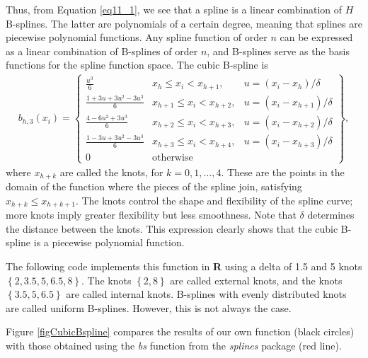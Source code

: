 Thus, from Equation \ref{eq11_1}, we see that a spline is a linear combination of \(H\) B-splines. The latter are polynomials of a certain degree, meaning that splines are piecewise polynomial functions. Any spline function of order \(n\) can be expressed as a linear combination of B-splines of order \(n\), and B-splines serve as the basis functions for the spline function space.
The cubic B-spline is 
\begin{align*}
	b_{h,3}(x_i)=\begin{Bmatrix}
		\frac{u^3}{6} & x_h \leq x_i < x_{h+1}, & u=(x_i-x_h)/\delta\\
		\frac{1+3u+3u^2-3u^3}{6} & x_{h+1} \leq x_i < x_{h+2}, & u=(x_i-x_{h+1})/\delta\\
		\frac{4-6u^2+3u^3}{6} & x_{h+2} \leq x_i < x_{h+3}, & u=(x_i-x_{h+2})/\delta\\
		\frac{1-3u+3u^2-3u^3}{6} & x_{h+3} \leq x_i < x_{h+4}, & u=(x_i-x_{h+3})/\delta\\
		0 & \text{otherwise}
	\end{Bmatrix},
\end{align*}
where \(x_{h+k}\) are called the knots, for \(k=0,1,\dots,4\). These are the points in the domain of the function where the pieces of the spline join, satisfying \(x_{h+k} \leq x_{h+k+1}\). The knots control the shape and flexibility of the spline curve; more knots imply greater flexibility but less smoothness. Note that \(\delta\) determines the distance between the knots. This expression clearly shows that the cubic B-spline is a piecewise polynomial function.

The following code implements this function in \textbf{R} using a delta of 1.5 and 5 knots \( \left\{2, 3.5, 5, 6.5, 8\right\} \). The knots \( \left\{2, 8\right\} \) are called external knots, and the knots \( \left\{3.5, 5, 6.5\right\} \) are called internal knots. B-splines with evenly distributed knots are called uniform B-splines. However, this is not always the case.

Figure \ref{figCubicBspline} compares the results of our own function (black circles) with those obtained using the \textit{bs} function from the \textit{splines} package (red line).

